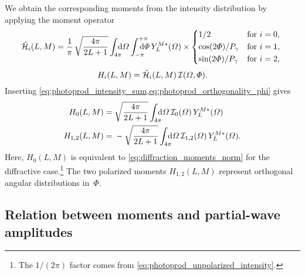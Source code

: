 We obtain the corresponding moments from the intensity distribution by
applying the moment operator
\begin{equation}
  \label{eq:photoprod_moment_operator}
  \hat{\mathcal{H}}_i(L, M)
  = \frac{1}{\pi}\, \sqrt{\frac{4 \pi}{2 L + 1}}
  \int_{4 \pi}\!\!\!\! \dif{\Omega} \int_{-\pi}^{+\pi}\hspace{-1.2em} \dif{\Phi}\,
  Y_L^{M *}(\Omega) \times \begin{cases*}
    1 / 2                   & for $i = 0$, \\
    \cos(2 \Phi) / P_\gamma & for $i = 1$, \\
    \sin(2 \Phi) / P_\gamma & for $i = 2$,
  \end{cases*}
\end{equation}
\ie
\begin{equation}
  \label{eq:photoprod_moments}
  H_i(L, M)
  = \hat{\mathcal{H}}_i(L, M)\, \mathcal{I}(\Omega, \Phi).
\end{equation}
Inserting
\cref{eq:photoprod_intensity_sum,eq:photoprod_orthogonality_phi} gives
\begin{align}
  \label{eq:photoprod_moments_H0}
  H_0(L, M)
  ={}& \sqrt{\frac{4 \pi}{2 L + 1}} \int_{4 \pi}\!\!\!\! \dif{\Omega}\,
  \intensity_0(\Omega)\, Y_L^{M *}(\Omega)
  \\
  \label{eq:photoprod_moments_H12}
  H_{1, 2}(L, M)
  ={}& -\sqrt{\frac{4 \pi}{2 L + 1}} \int_{4 \pi}\!\!\!\! \dif{\Omega}\,
  \intensity_{1, 2}(\Omega)\, Y_L^{M *}(\Omega).
\end{align}
Here, $H_0(L, M)$ is equivalent to \cref{eq:diffraction_moments_norm}
for the diffractive case.\footnote{The $1 / (2 \pi)$ factor comes from
\cref{eq:photoprod_unpolarized_intensity}.}  The two polarized moments
$H_{1, 2}(L, M)$ represent orthogonal angular distributions in~$\Phi$.


\subsection{Relation between moments and partial-wave amplitudes}%
\label{sec:photoprod:moments_pw}

